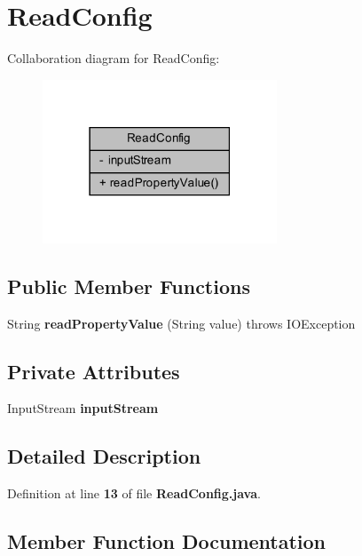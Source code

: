 \section{Read\+Config}
\label{classch_1_1bfh_1_1gr33nopo55um_1_1enocean_1_1helper_1_1ReadConfig}


Collaboration diagram for Read\+Config\+:\nopagebreak
\begin{figure}[H]
\begin{center}
\leavevmode
\includegraphics[width=198pt]{d0/d19/classch_1_1bfh_1_1gr33nopo55um_1_1enocean_1_1helper_1_1ReadConfig__coll__graph}
\end{center}
\end{figure}
\subsection*{Public Member Functions}
\begin{DoxyCompactItemize}
\item 
String {\bf read\+Property\+Value} (String value)  throws I\+O\+Exception 
\end{DoxyCompactItemize}
\subsection*{Private Attributes}
\begin{DoxyCompactItemize}
\item 
Input\+Stream {\bf input\+Stream}
\end{DoxyCompactItemize}


\subsection{Detailed Description}


Definition at line {\bf 13} of file {\bf Read\+Config.\+java}.



\subsection{Member Function Documentation}
\label{classch_1_1bfh_1_1gr33nopo55um_1_1enocean_1_1helper_1_1ReadConfig_ae35dac9ca5a65b5c8b8e11dfabb13dca} 
